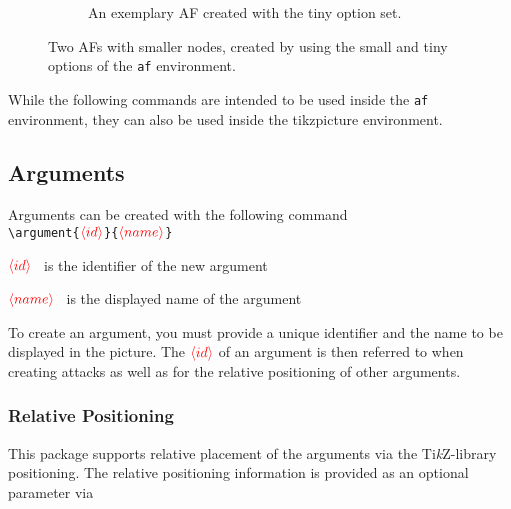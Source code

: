 \documentclass{article}
\newcommand{\tikzname}{Ti\emph{k}Z\xspace}
\newcommand{\opt}[2][red]{\ensuremath{\textcolor{#1}{\langle #2\rangle}}}
\begin{document}
\begin{figure}[ht]
\begin{subfigure}{0.48\textwidth}
\begin{af}[tiny]

        \end{af}
        \caption{An exemplary AF created with the \textsf{tiny} option set.}
        \label{fig:example_tiny}
    \end{subfigure}
    \caption{Two AFs with smaller nodes, created by using the \textsf{small} and \textsf{tiny} options of the \texttt{af} environment.}
    \label{fig:mini_afs}
    
\end{figure}

While the following commands are intended to be used inside the \texttt{af} environment, they can also be used inside the \textsf{tikzpicture} environment.

\subsection{Arguments}
    Arguments can be created with the following command\\

    \noindent
    \verb|\argument{|\opt{id}\verb|}{|\opt{name}\verb|}|
    
    \begin{list}{}{\leftmargin=\parindent\rightmargin=0pt}
        \item\opt{id}~ is the identifier of the new argument
        \item\opt{name}~ is the displayed name of the argument
        \item To create an argument, you must provide a unique identifier and the name to be displayed in the picture.
        The \opt{id} of an argument is then referred to when creating attacks as well as for the relative positioning of other arguments.

    \end{list}

\subsubsection{Relative Positioning}    
    This package supports relative placement of the arguments via the \tikzname-library \textsf{positioning}.
    The relative positioning information is provided as an optional parameter via\\
\end{document}
